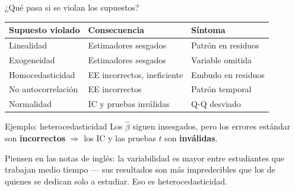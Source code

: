 \documentclass[aspectratio=169, 11pt]{beamer}
\begin{document}
\begin{frame}{¿Qué pasa si se violan los supuestos?}
\small
\begin{center}
\renewcommand{\arraystretch}{1.2}
\begin{tabular}{lll}
\toprule
\textbf{Supuesto violado} & \textbf{Consecuencia} & \textbf{Síntoma} \\
\midrule
Linealidad & Estimadores sesgados & Patr\'on en residuos \\
Exogeneidad & Estimadores sesgados & Variable omitida \\
Homocedasticidad & EE incorrectos, ineficiente & Embudo en residuos \\
No autocorrelaci\'on & EE incorrectos & Patr\'on temporal \\
Normalidad & IC y pruebas inv\'alidas & Q-Q desviado \\
\bottomrule
\end{tabular}
\end{center}

\begin{exampleblock}{Ejemplo: heterocedasticidad}
\small
Los $\hat{\beta}$ siguen insesgados, pero los errores est\'andar son \textbf{incorrectos}
$\Rightarrow$ los IC y las pruebas $t$ son \textbf{inv\'alidas}.

\smallskip
Piensen en las notas de ingl\'es: la variabilidad es mayor entre estudiantes que trabajan medio tiempo --- sus resultados son m\'as impredecibles que los de quienes se dedican solo a estudiar. Eso es heterocedasticidad.
\end{exampleblock}
\end{frame}
\end{document}
